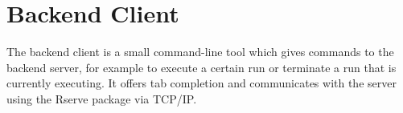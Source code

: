 
	\section{Backend Client}
	The backend client is a small command-line tool which gives commands to the backend server, for example to execute a certain run or terminate a run that is currently executing. It offers tab completion and communicates with the server using the Rserve package via TCP/IP.
	